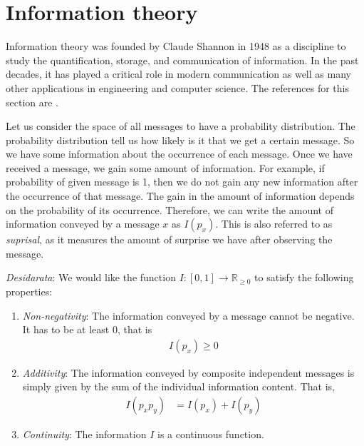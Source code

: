 \documentclass[a4paper, 12pt]{book}
\begin{document}
\section{Information theory}
Information theory was founded by Claude Shannon in 1948 as a discipline to study the quantification, storage, and communication of information. In the past decades, it has played a critical role in modern communication as well as many other applications in engineering and computer science. The references for this section are \cite{unpingco2016python}.

Let us consider the space of all messages to have a probability distribution. The probability distribution tell us how likely is it that we get a certain message. So we have some information about the occurrence of each message. Once we have received a message, we gain some amount of information. For example, if probability of given message is 1, then we do not gain any new information after the occurrence of that message. The gain in the amount of information depends on the probability of its occurrence. Therefore, we can write the amount of information conveyed by a message $x$ as $I(p_x)$. This is also referred to as \emph{suprisal}, as it measures the amount of surprise we have after observing the message. 

\emph{Desidarata}: We would like the function $I: [0,1] \longrightarrow \mathbb{R}_{\geq 0}$ to satisfy the following properties:
\begin{enumerate}
    \item \emph{Non-negativity}: The information conveyed by a message cannot be negative. It has to be at least 0, that is
    \begin{align}
        I(p_x) \geq 0
    \end{align}
    \item \emph{Additivity}: The information conveyed by composite independent messages is simply given by the sum of the individual information content. That is,
    \begin{align}
        I(p_x p_y) &= I(p_x) + I(p_y)
    \end{align}
    \item \emph{Continuity}: The information $I$ is a continuous function.
\end{enumerate}
\end{document}
